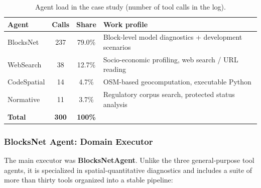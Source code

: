 \begin{table}[h]
\centering
\small
\begin{tabular}{lccl}
\hline
\textbf{Agent} & \textbf{Calls} & \textbf{Share} & \textbf{Work profile} \\
\hline
BlocksNet    & 237 & 79.0\% & Block-level model diagnostics + development scenarios \\
WebSearch    & 38  & 12.7\% & Socio-economic profiling, web search / URL reading \\
CodeSpatial  & 14  & 4.7\%  & OSM-based geocomputation, executable Python \\
Normative    & 11  & 3.7\%  & Regulatory corpus search, protected status analysis \\
\hline
\textbf{Total} & \textbf{300} & \textbf{100\%} & \\
\hline
\end{tabular}
\caption{Agent load in the case study (number of tool calls in the log).}
\label{table:case_agent_load}
\end{table}

\subsubsection{BlocksNet Agent: Domain Executor}

The main executor was \textbf{BlocksNetAgent}.
Unlike the three general-purpose tool agents, it is specialized in spatial-quantitative diagnostics and includes a suite of more than thirty tools organized into a stable pipeline: 

